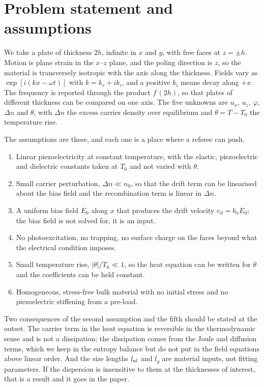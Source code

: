 \documentclass[11pt]{article}
\begin{document}
\section{Problem statement and assumptions}

We take a plate of thickness $2h$, infinite in $x$ and $y$, with free faces at $z=\pm h$. Motion is plane
strain in the $x$--$z$ plane, and the poling direction is $z$, so the material is transversely isotropic
with the axis along the thickness. Fields vary as $\exp[i(kx-\omega t)]$ with $k=k_r+ik_i$, and a positive
$k_i$ means decay along $+x$. The frequency is reported through the product $f\,(2h)$, so that plates of
different thickness can be compared on one axis. The five unknowns are $u_x$, $u_z$, $\varphi$, $\Delta n$
and $\theta$, with $\Delta n$ the excess carrier density over equilibrium and $\theta=T-T_0$ the
temperature rise.

The assumptions are these, and each one is a place where a referee can push.

\begin{enumerate}
\item Linear piezoelectricity at constant temperature, with the elastic, piezoelectric and dielectric
constants taken at $T_0$ and not varied with $\theta$.
\item Small carrier perturbation, $\Delta n\ll n_0$, so that the drift term can be linearised about the
bias field and the recombination term is linear in $\Delta n$.
\item A uniform bias field $E_0$ along $x$ that produces the drift velocity $v_d=b_nE_0$; the bias field is
not solved for, it is an input.
\item No photoexcitation, no trapping, no surface charge on the faces beyond what the electrical condition
imposes.
\item Small temperature rise, $|\theta|/T_0\ll1$, so the heat equation can be written for $\theta$ and the
coefficients can be held constant.
\item Homogeneous, stress-free bulk material with no initial stress and no piezoelectric stiffening from a
pre-load.
\end{enumerate}

Two consequences of the second assumption and the fifth should be stated at the outset. The carrier term in
the heat equation is reversible in the thermodynamic sense and is not a dissipation; the dissipation comes
from the Joule and diffusion terms, which we keep in the entropy balance but do not put in the field
equations above linear order. And the size lengths $l_{\rm nl}$ and $l_g$ are material inputs, not fitting
parameters. If the dispersion is insensitive to them at the thicknesses of interest, that is a result and
it goes in the paper.
\end{document}
